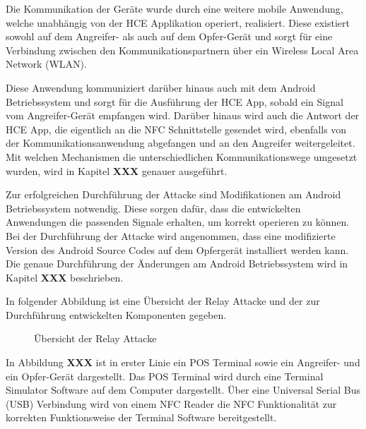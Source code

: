 Die Kommunikation der Geräte wurde durch eine weitere mobile Anwendung, welche unabhängig von der HCE Applikation operiert, realisiert. Diese existiert sowohl auf dem Angreifer- als auch auf dem Opfer-Gerät und sorgt für eine Verbindung zwischen den Kommunikationspartnern über ein Wireless Local Area Network (WLAN). 

Diese Anwendung kommuniziert darüber hinaus auch mit dem Android Betriebssystem und sorgt für die Ausführung der HCE App, sobald ein Signal vom Angreifer-Gerät empfangen wird. Darüber hinaus wird auch die Antwort der HCE App, die eigentlich an die NFC Schnittstelle gesendet wird, ebenfalls von der Kommunikationsanwendung abgefangen und an den Angreifer weitergeleitet. Mit welchen Mechanismen die unterschiedlichen Kommunikationswege umgesetzt wurden, wird in Kapitel \textbf{XXX} genauer ausgeführt. 

Zur erfolgreichen Durchführung der Attacke sind Modifikationen am Android Betriebssystem notwendig. Diese sorgen dafür, dass die entwickelten Anwendungen die passenden Signale erhalten, um korrekt operieren zu können. Bei der Durchführung der Attacke wird angenommen, dass eine modifizierte Version des Android Source Codes auf dem Opfergerät installiert werden kann.
Die genaue Durchführung der Änderungen am Android Betriebssystem wird in Kapitel \textbf{XXX} beschrieben. 

In folgender Abbildung ist eine Übersicht der Relay Attacke und der zur Durchführung entwickelten Komponenten gegeben. 

\begin{figure}
	\centering
	\caption{Übersicht der Relay Attacke}
\end{figure}

In Abbildung \textbf{XXX} ist in erster Linie ein POS Terminal sowie ein Angreifer- und ein Opfer-Gerät dargestellt. Das POS Terminal wird durch eine Terminal Simulator Software auf dem Computer dargestellt. Über eine Universal Serial Bus (USB) Verbindung wird von einem NFC Reader die NFC Funktionalität zur korrekten Funktionsweise der Terminal Software bereitgestellt. 

